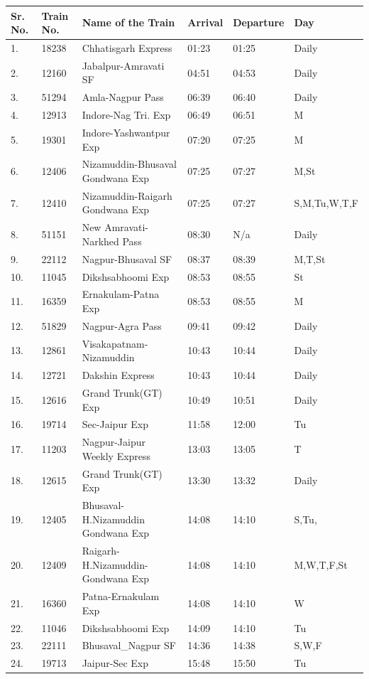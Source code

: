 \documentclass{article}
\begin{document}
\begin{tabular}{llllll}
\toprule
Sr. No. & Train No. & Name of the Train & Arrival & Departure & Day \\
\midrule
1. & 18238 & Chhatisgarh Express & 01:23 & 01:25 & Daily \\
2. & 12160 & Jabalpur-Amravati SF & 04:51 & 04:53 & Daily \\
3. & 51294 & Amla-Nagpur Pass & 06:39 & 06:40 & Daily \\
4. & 12913 & Indore-Nag Tri. Exp & 06:49 & 06:51 & M \\
5. & 19301 & Indore-Yashwantpur Exp & 07:20 & 07:25 & M \\
6. & 12406 & Nizamuddin-Bhusaval Gondwana Exp & 07:25 & 07:27 & M,St \\
7. & 12410 & Nizamuddin-Raigarh Gondwana Exp & 07:25 & 07:27 & S,M,Tu,W,T,F \\
8. & 51151 & New Amravati-Narkhed Pass & 08:30 & N/a & Daily \\
9. & 22112 & Nagpur-Bhusaval SF & 08:37 & 08:39 & M,T,St \\
10. & 11045 & Dikshsabhoomi Exp & 08:53 & 08:55 & St \\
11. & 16359 & Ernakulam-Patna Exp & 08:53 & 08:55 & M \\
12. & 51829 & Nagpur-Agra Pass & 09:41 & 09:42 & Daily \\
13. & 12861 & Visakapatnam-Nizamuddin & 10:43 & 10:44 & Daily \\
14. & 12721 & Dakshin Express & 10:43 & 10:44 & Daily \\
15. & 12616 & Grand Trunk(GT) Exp & 10:49 & 10:51 & Daily \\
16. & 19714 & Sec-Jaipur Exp & 11:58 & 12:00 & Tu \\
17. & 11203 & Nagpur-Jaipur Weekly Express & 13:03 & 13:05 & T \\
18. & 12615 & Grand Trunk(GT) Exp & 13:30 & 13:32 & Daily \\
19. & 12405 & Bhusaval-H.Nizamuddin Gondwana Exp & 14:08 & 14:10 & S,Tu, \\
20. & 12409 & Raigarh-H.Nizamuddin- Gondwana Exp & 14:08 & 14:10 & M,W,T,F,St \\
21. & 16360 & Patna-Ernakulam Exp & 14:08 & 14:10 & W \\
22. & 11046 & Dikshsabhoomi Exp & 14:09 & 14:10 & Tu \\
23. & 22111 & Bhusaval\_Nagpur SF & 14:36 & 14:38 & S,W,F \\
24. & 19713 & Jaipur-Sec Exp & 15:48 & 15:50 & Tu \\

\end{tabular}
\end{document}
